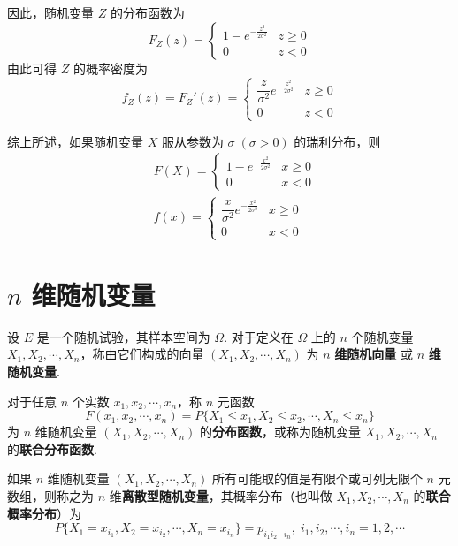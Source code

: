 因此，随机变量 $Z$ 的分布函数为
$$
F_{Z}(z) = \begin{cases}
    1 - e^{-\frac{z^2}{2 \sigma^2}} & z \geqslant 0 \\
    0 & z<0
\end{cases}
$$
由此可得 $Z$ 的概率密度为
$$
f_{Z}(z) = F_{Z}'(z) = \begin{cases}
    \dfrac{z}{\sigma^2} e^{-\frac{z^2}{2 \sigma^2}} & z \geqslant 0 \\[0.5em]
    0 & z<0
\end{cases}
$$

综上所述，如果随机变量 $X$ 服从参数为 $\sigma \; (\sigma > 0)$ 的瑞利分布，则
$$
\begin{aligned}
    & F(X) = \begin{cases}
        1 - e^{-\frac{x^2}{2 \sigma^2}} & x \geqslant 0 \\
        0 & x<0
    \end{cases} \\[0.5em]
    & f(x) = \begin{cases}
        \dfrac{x}{\sigma^2} e^{-\frac{x^2}{2 \sigma^2}} & x \geqslant 0 \\[0.5em]
        0 & x<0
    \end{cases}
\end{aligned}
$$

\section{$n$ 维随机变量}

\begin{definition}
    设 $E$ 是一个随机试验，其样本空间为 $\varOmega$. 对于定义在 $\varOmega$ 上的 $n$ 个随机变量 $X_1,X_2,\cdots,X_n$，称由它们构成的向量 $(X_1,X_2,\cdots,X_n)$ 为 $n$ \textbf{维随机向量} 或 $n$ \textbf{维随机变量}.
\end{definition}

\begin{definition}
    对于任意 $n$ 个实数 $x_1,x_2,\cdots,x_n$，称 $n$ 元函数
    $$
    F(x_1,x_2,\cdots,x_n) = P\{X_1 \leqslant x_1, X_2 \leqslant x_2, \cdots, X_n \leqslant x_n\}
    $$
    为 $n$ 维随机变量 $(X_1,X_2,\cdots,X_n)$ 的\textbf{分布函数}，或称为随机变量 $X_1,X_2,\cdots,X_n$ 的\textbf{联合分布函数}.
\end{definition}

\begin{definition}
    如果 $n$ 维随机变量 $(X_1,X_2,\cdots,X_n)$ 所有可能取的值是有限个或可列无限个 $n$ 元数组，则称之为 $n$ 维\textbf{离散型随机变量}，其概率分布（也叫做 $X_1,X_2,\cdots,X_n$ 的\textbf{联合概率分布}）为
    $$
    P\{X_1 = x_{i_1}, X_2 = x_{i_2}, \cdots, X_n = x_{i_n}\} = p_{i_1 i_2 \cdots i_n}, \; i_1, i_2, \cdots, i_n = 1,2,\cdots
    $$
\end{definition}


